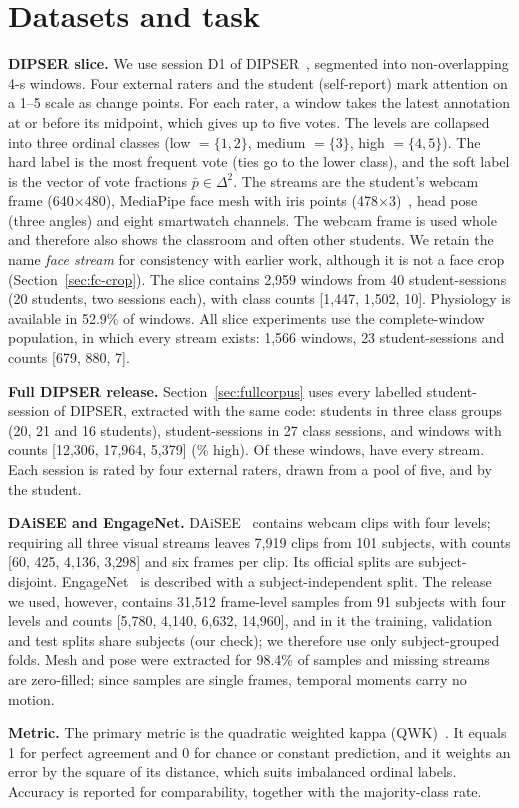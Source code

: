 \section{Datasets and task}
\label{sec:data}

\textbf{DIPSER slice.} We use session D1 of DIPSER~\cite{marquezcarpintero2025dipser}, segmented into non-overlapping 4-s windows. Four external raters and the student (self-report) mark attention on a 1--5 scale as change points. For each rater, a window takes the latest annotation at or before its midpoint, which gives up to five votes. The levels are collapsed into three ordinal classes (low $=\{1,2\}$, medium $=\{3\}$, high $=\{4,5\}$). The hard label is the most frequent vote (ties go to the lower class), and the soft label is the vector of vote fractions $\bar p\in\Delta^{2}$. The streams are the student's webcam frame (640$\times$480), MediaPipe face mesh with iris points (478$\times$3)~\cite{kartynnik2019facemesh,grishchenko2020attentionmesh}, head pose (three angles) and eight smartwatch channels. The webcam frame is used whole and therefore also shows the classroom and often other students. We retain the name \emph{face stream} for consistency with earlier work, although it is not a face crop (Section~\ref{sec:fc-crop}). The slice contains 2{,}959 windows from 40 student-sessions (20 students, two sessions each), with class counts [1{,}447, 1{,}502, 10]. Physiology is available in 52.9\% of windows. All slice experiments use the complete-window population, in which every stream exists: 1{,}566 windows, 23 student-sessions and counts [679, 880, 7].

\textbf{Full DIPSER release.} Section~\ref{sec:fullcorpus} uses every labelled student-session of DIPSER, extracted with the same code: \fcPersons{} students in three class groups (20, 21 and 16 students), \fcSessions{} student-sessions in 27 class sessions, and \fcWindows{} windows with counts [12{,}306, 17{,}964, 5{,}379] (\fcShareHigh\% high). Of these windows, \fcComplete{} have every stream. Each session is rated by four external raters, drawn from a pool of five, and by the student.

\textbf{DAiSEE and EngageNet.} DAiSEE~\cite{gupta2016daisee} contains webcam clips with four levels; requiring all three visual streams leaves 7{,}919 clips from 101 subjects, with counts [60, 425, 4{,}136, 3{,}298] and six frames per clip. Its official splits are subject-disjoint. EngageNet~\cite{singh2023engagenet} is described with a subject-independent split. The release we used, however, contains 31{,}512 frame-level samples from 91 subjects with four levels and counts [5{,}780, 4{,}140, 6{,}632, 14{,}960], and in it the training, validation and test splits share subjects (our check); we therefore use only subject-grouped folds. Mesh and pose were extracted for 98.4\% of samples and missing streams are zero-filled; since samples are single frames, temporal moments carry no motion.

\textbf{Metric.} The primary metric is the quadratic weighted kappa (QWK)~\cite{cohen1968weighted}. It equals 1 for perfect agreement and 0 for chance or constant prediction, and it weights an error by the square of its distance, which suits imbalanced ordinal labels. Accuracy is reported for comparability, together with the majority-class rate.
